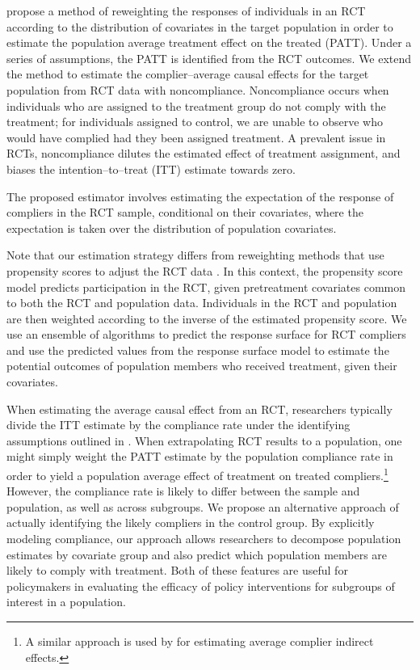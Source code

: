 \documentclass[hidelinks,12pt]{article}
\begin{document}
\citet{Hartman} propose a method of reweighting the responses of individuals in an RCT according to the distribution of covariates in the target population in order to estimate the population average treatment effect on the treated (PATT). Under a series of assumptions, the PATT is identified from the RCT outcomes. {\color{red}We extend the method to estimate the complier--average causal effects for the target population from RCT data with noncompliance. Noncompliance occurs when individuals who are assigned to the treatment group do not comply with the treatment; for individuals assigned to control, we are unable to observe who would have complied had they been assigned treatment. A prevalent issue in RCTs, noncompliance dilutes the estimated effect of treatment assignment, and biases the intention--to--treat (ITT) estimate towards zero.}

The proposed estimator involves estimating the expectation of the response of compliers in the RCT sample, conditional on their covariates, where the expectation is taken over the distribution of population covariates. {\color{red}Note that our estimation strategy differs from reweighting methods that use propensity scores to adjust the RCT data \citep{stuart2011use}. In this context, the propensity score model predicts participation in the RCT, given pretreatment covariates common to both the RCT and population data. Individuals in the RCT and population are then weighted according to the inverse of the estimated propensity score. We use an ensemble of algorithms to predict the response surface for RCT compliers and use the predicted values from the response surface model to estimate the potential outcomes of population members who received treatment, given their covariates.

When estimating the average causal effect from an RCT, researchers typically divide the ITT estimate by the compliance rate under the identifying assumptions outlined in \citet{Angrist1996}. When extrapolating RCT results to a population, one might simply weight the PATT estimate by the population compliance rate in order to yield a population average effect of treatment on treated compliers.\footnote{A similar approach is used by \cite{imai2013experimental} for estimating average complier indirect effects.} However, the compliance rate is likely to differ between the sample and population, as well as across subgroups. We propose an alternative approach of actually identifying the likely compliers in the control group. By explicitly modeling compliance, our approach allows researchers to decompose population estimates by covariate group and also predict which population members are likely to comply with treatment. Both of these features are useful for policymakers in evaluating the efficacy of policy interventions for subgroups of interest in a population. 
}
\end{document}
